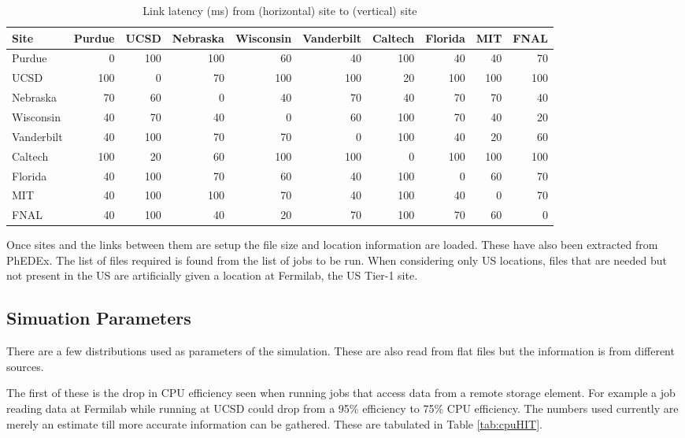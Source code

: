 \documentclass[a4paper]{jpconf}
\begin{document}
\begin{table}
  \begin{center}
    \begin{footnotesize}
      \begin{tabular}{|l|rrrrrrrrr|}
        \hline
        Site & Purdue & UCSD & Nebraska & Wisconsin & Vanderbilt & Caltech & Florida & MIT & FNAL \\
        \hline
        Purdue & 0 & 100 & 100 & 60 & 40 & 100 & 40 & 40 & 70 \\
        UCSD & 100 & 0 & 70 & 100 & 100 & 20 & 100 & 100 & 100 \\
        Nebraska & 70 & 60 & 0 & 40 & 70 & 40 & 70 & 70 & 40 \\
        Wisconsin & 40 & 70 & 40 & 0 & 60 & 100 & 70 & 40 & 20 \\
        Vanderbilt & 40 & 100 & 70 & 70 & 0 & 100 & 40 & 20 & 60 \\
        Caltech & 100 & 20 & 60 & 100 & 100 & 0 & 100 & 100 & 100 \\
        Florida & 40 & 100 & 70 & 60 & 40 & 100 & 0 & 60 & 70 \\
        MIT & 40 & 100 & 100 & 70 & 40 & 100 & 40 & 0 & 70 \\
        FNAL & 40 & 100 & 40 & 20 & 70 & 100 & 70 & 60 & 0 \\
        \hline
      \end{tabular}
      \caption{Link latency (ms) from (horizontal) site to (vertical) site\label{tab:latency}}
    \end{footnotesize}
  \end{center}
\end{table}

Once sites and the links between them are setup the file size and
location information are loaded. These have also been extracted from
PhEDEx. The list of files required is found from the list of jobs to
be run. When considering only US locations, files that are needed but
not present in the US are artificially given a location at Fermilab,
the US Tier-1 site.

\subsection{Simuation Parameters}

There are a few distributions used as parameters of the
simulation. These are also read from flat files but the information is
from different sources.

The first of these is the drop in CPU efficiency seen when running
jobs that access data from a remote storage element. For example a job
reading data at Fermilab while running at UCSD could drop from a 95\%
efficiency to 75\% CPU efficiency. The numbers used currently are
merely an estimate till more accurate information can be
gathered. These are tabulated in Table \ref{tab:cpuHIT}.
\end{document}
